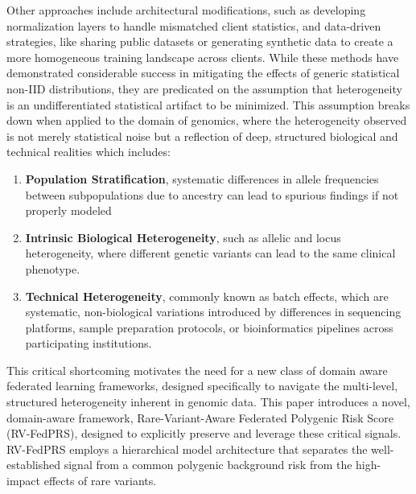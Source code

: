 \documentclass[conference]{IEEEtran}
\begin{document}
Other approaches include architectural modifications, such as developing normalization layers to handle mismatched client statistics, and data-driven strategies, like sharing public datasets or generating synthetic data to create a more homogeneous training landscape across clients. While these methods have demonstrated considerable success in mitigating the effects of generic statistical non-IID distributions, they are predicated on the assumption that heterogeneity is an undifferentiated statistical artifact to be minimized. This assumption breaks down when applied to the domain of genomics, where the heterogeneity observed is not merely statistical noise but a reflection of deep, structured biological and technical realities which includes:
\begin{enumerate}
    \item \textbf{Population Stratification}, systematic differences in allele frequencies between subpopulations due to ancestry can lead to spurious findings if not properly modeled
    \item  \textbf{Intrinsic Biological Heterogeneity}, such as allelic and locus heterogeneity, where different genetic variants can lead to the same clinical phenotype.
    \item \textbf{Technical Heterogeneity}, commonly known as batch effects, which are systematic, non-biological variations introduced by differences in sequencing platforms, sample preparation protocols, or bioinformatics pipelines across participating institutions.
\end{enumerate}
This critical shortcoming motivates the need for a new class of domain aware federated learning frameworks, designed specifically to navigate the multi-level, structured heterogeneity inherent in genomic data. This paper introduces a novel, domain-aware framework, Rare-Variant-Aware Federated Polygenic Risk Score (RV-FedPRS), designed to explicitly preserve and leverage these critical signals. RV-FedPRS employs a hierarchical model architecture that separates the well-established signal from a common polygenic background risk from the high-impact effects of rare variants.

\vspace{-0.35cm}
\end{document}
